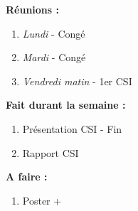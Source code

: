 \textbf{Réunions :}
\begin{enumerate}[label=\textbullet]
	\item \textit{Lundi} - Congé
	\item \textit{Mardi} - Congé
	\item \textit{Vendredi matin} - 1er CSI
\end{enumerate}
\textbf{Fait durant la semaine :}
\begin{enumerate}[label=\textbullet]
	\item Présentation CSI - Fin
	\item Rapport CSI
\end{enumerate}
\textbf{A faire :}
\begin{enumerate}[label=\textbullet]
	\item Poster + 
\end{enumerate}